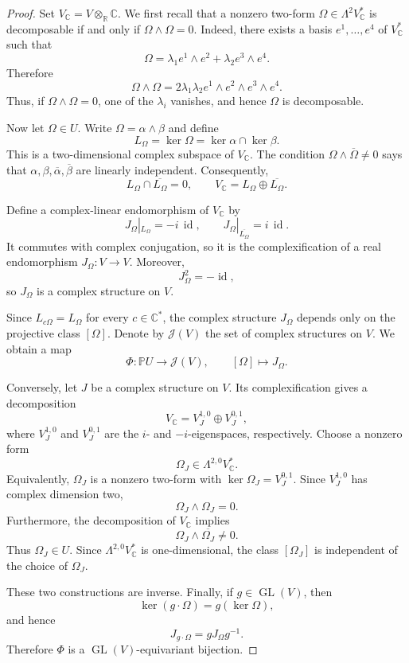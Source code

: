 \begin{proof}
Set $V_{\mathbb C}
=V\otimes_{\mathbb R}\mathbb C$.
We first recall that a nonzero two-form
$\Omega\in\Lambda^2V_{\mathbb C}^*$
is decomposable if and only if
$\Omega\wedge\Omega=0$.
Indeed, there exists a basis
$e^1,\ldots,e^4$ of $V_{\mathbb C}^*$
such that
\[
\Omega
=
\lambda_1e^1\wedge e^2
+
\lambda_2e^3\wedge e^4.
\]
Therefore
\[
\Omega\wedge\Omega
=
2\lambda_1\lambda_2
e^1\wedge e^2\wedge e^3\wedge e^4.
\]
Thus, if $\Omega\wedge\Omega=0$,
one of the $\lambda_i$ vanishes,
and hence $\Omega$ is decomposable.

Now let $\Omega\in U$. Write
$\Omega=\alpha\wedge\beta$ and define
\[
L_\Omega
=
\ker\Omega
=
\ker\alpha\cap\ker\beta.
\]
This is a two-dimensional complex
subspace of $V_{\mathbb C}$.
The condition
$\Omega\wedge\overline{\Omega}\ne0$
says that
$\alpha,\beta,\overline{\alpha},
\overline{\beta}$ are linearly
independent. Consequently,
\[
L_\Omega\cap\overline{L_\Omega}=0,
\qquad
V_{\mathbb C}
=
L_\Omega\oplus\overline{L_\Omega}.
\]

Define a complex-linear endomorphism of
$V_{\mathbb C}$ by
\[
J_\Omega|_{L_\Omega}
=
-i\,\operatorname{id},
\qquad
J_\Omega|_{\overline{L_\Omega}}
=
i\,\operatorname{id}.
\]
It commutes with complex conjugation,
so it is the complexification of a real
endomorphism $J_\Omega:V\to V$.
Moreover,
\[
J_\Omega^2=-\operatorname{id},
\]
so $J_\Omega$ is a complex structure
on $V$.

Since $L_{c\Omega}=L_\Omega$ for every
$c\in\mathbb C^*$, the complex structure
$J_\Omega$ depends only on the projective
class $[\Omega]$. Denote by
$\mathcal J(V)$ the set of complex
structures on $V$. We obtain a map
\[
\Phi:\mathbb PU\longrightarrow\mathcal J(V),
\qquad
[\Omega]\longmapsto J_\Omega.
\]

Conversely, let $J$ be a complex
structure on $V$. Its complexification
gives a decomposition
\[
V_{\mathbb C}
=
V_J^{1,0}\oplus V_J^{0,1},
\]
where $V_J^{1,0}$ and $V_J^{0,1}$ are
the $i$- and $-i$-eigenspaces,
respectively. Choose a nonzero form
\[
\Omega_J
\in
\Lambda^{2,0}V_{\mathbb C}^*.
\]
Equivalently, $\Omega_J$ is a nonzero
two-form with
$\ker\Omega_J=V_J^{0,1}$.
Since $V_J^{1,0}$ has complex dimension
two,
\[
\Omega_J\wedge\Omega_J=0.
\]
Furthermore, the decomposition of
$V_{\mathbb C}$ implies
\[
\Omega_J\wedge\overline{\Omega_J}\ne0.
\]
Thus $\Omega_J\in U$. Since
$\Lambda^{2,0}V_{\mathbb C}^*$ is
one-dimensional, the class $[\Omega_J]$
is independent of the choice of
$\Omega_J$.

These two constructions are inverse.
Finally, if $g\in\operatorname{GL}(V)$,
then
\[
\ker(g\cdot\Omega)=g(\ker\Omega),
\]
and hence
\[
J_{g\cdot\Omega}
=
gJ_\Omega g^{-1}.
\]
Therefore $\Phi$ is a
$\operatorname{GL}(V)$-equivariant
bijection.
\end{proof}


